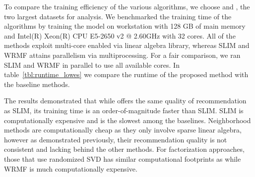 To compare the training efficiency of the various algorithms, we choose \Lowes and \MLens, the two largest datasets for analysis.
We benchmarked the training time of the algorithms 
by training the model on  workstation with 128 GB of main memory and Intel(R) Xeon(R) CPU E5-2650 v2 @ 2.60GHz with 32 cores. All of the methods exploit multi-core enabled via linear algebra library, whereas SLIM and WRMF attains parallelism via multiprocessing. For a fair comparison, we ran  SLIM and WRMF in parallel to use all available cores.  In table~\ref{tbl:runtime_lowes} we compare the runtime of the proposed method with the baseline methods. 

The results demonstrated that while \LinearLow offers the same quality of recommendation as SLIM, its training time is an order-of-magnitude 
faster than SLIM.  SLIM is computationally expensive and is the slowest among the baselines. 
Neighborhood methods are computationally cheap as they only involve sparse linear algebra, however as demonstrated previously, their recommendation
quality is not consistent and lacking behind the other methods. 
For factorization approaches, those that use randomized SVD has similar computational footprints as \LinearLow while
WRMF is much computationally expensive.




\begin{table}
\caption{Training time on the  \Lowes  and \MLens Dataset.}
\label{tbl:runtime_lowes}
\centering
{}

\end{table}
